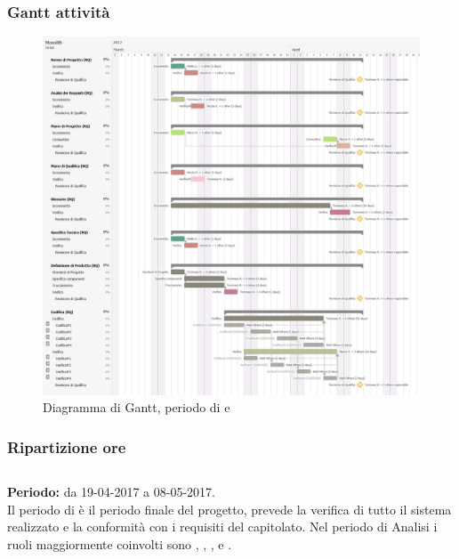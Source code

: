 \subsubsection{Gantt attività}
\begin{figure}[H]
	\centering
	\includegraphics[width=15cm]{gantt/Gantt_RQ2.png}
	\caption{Diagramma di Gantt, periodo di \PD{} e \Cod{}}
\end{figure}

\subsubsection{Ripartizione ore}
\bgroup
\egroup

\subsection{\VV{}}
\textbf{Periodo:} da 19-04-2017 a 08-05-2017. \\
Il periodo di \VV{} è il periodo finale del progetto, prevede la verifica di tutto il sistema realizzato e la conformità con i requisiti del capitolato.
Nel periodo di Analisi i ruoli maggiormente coinvolti sono \Programmatore{}, \Progettista{}, \Responsabile{}, \Amministratore{} e \Verificatore{}.
